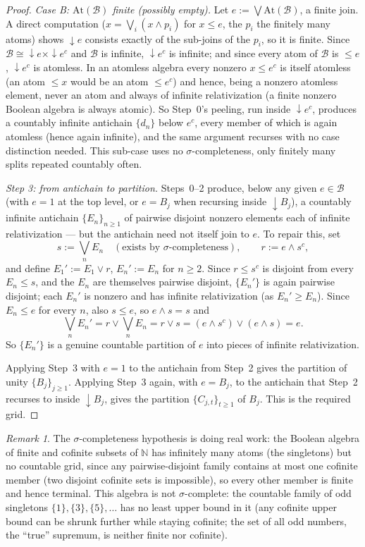 \documentclass{amsart}
\theoremstyle{definition}
\theoremstyle{remark}
\newtheorem{remark}[theorem]{Remark}
\newcommand{\nat}{\mathbb N}
\begin{document}
\begin{proof}
\emph{Case B: $\mathrm{At}(\mathcal B)$ finite (possibly empty).} Let
$e:=\bigvee\mathrm{At}(\mathcal B)$, a finite join. A direct computation
($x=\bigvee_i(x\wedge p_i)$ for $x\leq e$, the $p_i$ the finitely many
atoms) shows ${\downarrow}e$ consists exactly of the sub-joins of the
$p_i$, so it is finite. Since $\mathcal B\cong{\downarrow}e\times
{\downarrow}e^c$ and $\mathcal B$ is infinite, ${\downarrow}e^c$ is
infinite; and since every atom of $\mathcal B$ is $\leq e$,
${\downarrow}e^c$ is atomless. In an atomless algebra every nonzero
$x\leq e^c$ is itself atomless (an atom $\leq x$ would be an atom
$\leq e^c$) and hence, being a nonzero atomless element, never an atom
and always of infinite relativization (a finite nonzero Boolean algebra
is always atomic). So Step~0's peeling, run inside ${\downarrow}e^c$,
produces a countably infinite antichain $\{d_n\}$ below $e^c$, every
member of which is again atomless (hence again infinite), and the same
argument recurses with no case distinction needed. This sub-case uses no
$\sigma$-completeness, only finitely many splits repeated countably
often.

\emph{Step 3: from antichain to partition.} Steps~0--2 produce, below
any given $e\in\mathcal B$ (with $e=1$ at the top level, or $e=B_j$ when
recursing inside ${\downarrow}B_j$), a countably infinite antichain
$\{E_n\}_{n\geq1}$ of pairwise disjoint nonzero elements each of
infinite relativization --- but the antichain need not itself join to
$e$. To repair this, set
\[
s:=\bigvee_nE_n\quad(\text{exists by }\sigma\text{-completeness}),
\qquad
r:=e\wedge s^c,
\]
and define $E_1':=E_1\vee r$, $E_n':=E_n$ for $n\geq2$. Since $r\leq
s^c$ is disjoint from every $E_n\leq s$, and the $E_n$ are themselves
pairwise disjoint, $\{E_n'\}$ is again pairwise disjoint; each $E_n'$ is
nonzero and has infinite relativization (as $E_n'\geq E_n$). Since
$E_n\leq e$ for every $n$, also $s\leq e$, so $e\wedge s=s$ and
\[
\bigvee_nE_n'=r\vee\bigvee_nE_n=r\vee s=(e\wedge s^c)\vee(e\wedge s)=e.
\]
So $\{E_n'\}$ is a genuine countable partition of $e$ into pieces of
infinite relativization.

Applying Step~3 with $e=1$ to the antichain from Step~2 gives the
partition of unity $\{B_j\}_{j\geq1}$. Applying Step~3 again, with
$e=B_j$, to the antichain that Step~2 recurses to inside
${\downarrow}B_j$, gives the partition $\{C_{j,t}\}_{t\geq1}$ of $B_j$.
This is the required grid.
\end{proof}

\begin{remark}
The $\sigma$-completeness hypothesis is doing real work: the Boolean
algebra of finite and cofinite subsets of $\nat$ has infinitely many
atoms (the singletons) but no countable grid, since any pairwise-disjoint
family contains at most one cofinite member (two disjoint cofinite sets
is impossible), so every other member is finite and hence terminal. This
algebra is not $\sigma$-complete: the countable family of odd singletons
$\{1\},\{3\},\{5\},\dots$ has no least upper bound in it (any cofinite
upper bound can be shrunk further while staying cofinite; the set of all
odd numbers, the ``true'' supremum, is neither finite nor cofinite).
\end{remark}
\end{document}
